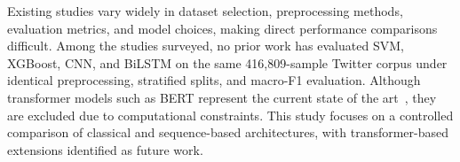 Existing studies vary widely in dataset selection, preprocessing methods, evaluation metrics, and model choices, making direct performance comparisons difficult. Among the studies surveyed, no prior work has evaluated SVM, XGBoost, CNN, and BiLSTM on the same 416,809-sample Twitter corpus under identical preprocessing, stratified splits, and macro-F1 evaluation. Although transformer models such as BERT represent the current state of the art~\citep{acheampong2021transformer, devlin2019bert}, they are excluded due to computational constraints. This study focuses on a controlled comparison of classical and sequence-based architectures, with transformer-based extensions identified as future work.
